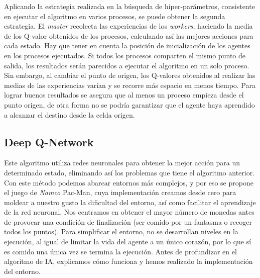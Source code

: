 		Aplicando la estrategia realizada en la búsqueda de hiper-parámetros, consistente en ejecutar el algoritmo en varios procesos, se puede obtener la segunda estrategia. El \textit{master} recolecta las experiencias de los \textit{workers}, haciendo la media de los Q-valor obtenidos de los procesos, calculando así las mejores acciones para cada estado. Hay que tener en cuenta la posición de inicialización de los agentes en los procesos ejecutados. Si todos los procesos comparten el mismo punto de salida, los resultados serán parecidos a ejecutar el algoritmo en un solo proceso. Sin embargo, al cambiar el punto de origen, los Q-valores obtenidos al realizar las medias de las experiencias varían y se recorre más espacio en menos tiempo. Para lograr buenos resultados se asegura que al menos un proceso empieza desde el punto origen, de otra forma no se podría garantizar que el agente haya aprendido a alcanzar el destino desde la celda origen.			
			
			
	
	
	
	
	\subsection{Deep Q-Network}
	\label{cap:3_3_2}
		Este algoritmo utiliza redes neuronales para obtener la mejor acción para un determinado estado, eliminando así los problemas que tiene el algoritmo anterior. Con este método podemos abarcar entornos más complejos, y por eso se propone el juego de \textit{Namco} Pac-Man, cuya implementación  creamos desde cero para moldear a nuestro gusto la dificultad del entorno, así como facilitar el aprendizaje de la red neuronal. Nos centramos en obtener el mayor número de monedas antes de provocar una condición de finalización (ser comido por un fantasma o recoger todos los puntos). Para simplificar el entorno, no se desarrollan niveles en la ejecución, al igual de limitar la vida del agente a un único corazón, por lo que sí es comido una única vez se termina la ejecución. Antes de profundizar en el algoritmo de IA, explicamos cómo funciona y hemos realizado la implementación del entorno.
	
